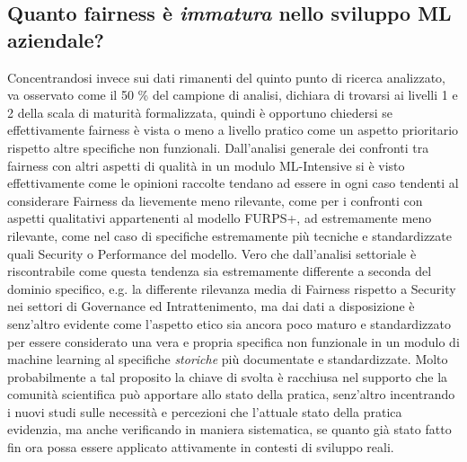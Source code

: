    \subsection{Quanto fairness è \emph{immatura} nello sviluppo ML aziendale?}
   Concentrandosi invece sui dati rimanenti del quinto punto di ricerca analizzato, va osservato come il 50 \% del campione di analisi, dichiara di trovarsi ai livelli 1 e 2 della scala di maturità formalizzata, quindi è opportuno chiedersi se effettivamente fairness è vista o meno a livello pratico come un aspetto prioritario rispetto altre specifiche non funzionali. Dall'analisi generale dei confronti tra fairness con altri aspetti di qualità in un modulo ML-Intensive si è visto effettivamente come le opinioni raccolte tendano ad essere in ogni caso tendenti al considerare Fairness da lievemente meno rilevante, come per i confronti con aspetti qualitativi appartenenti al modello FURPS+, ad estremamente meno rilevante, come nel caso di specifiche estremamente più tecniche e standardizzate quali Security o Performance del modello. Vero che dall'analisi settoriale è riscontrabile come questa tendenza sia estremamente differente a seconda del dominio specifico, e.g. la differente rilevanza media di Fairness rispetto a Security nei settori di Governance ed Intrattenimento, ma dai dati a disposizione è senz'altro evidente come l'aspetto etico sia ancora poco maturo e standardizzato per essere considerato una vera e propria specifica non funzionale in un modulo di machine learning al specifiche \emph{storiche} più documentate e standardizzate. Molto probabilmente a tal proposito la chiave di svolta è racchiusa nel supporto che la comunità scientifica può apportare allo stato della pratica, senz'altro incentrando i nuovi studi sulle necessità e percezioni che l'attuale stato della pratica evidenzia, ma anche verificando in maniera sistematica, se quanto già stato fatto fin ora possa essere applicato attivamente in contesti di sviluppo reali.
    
